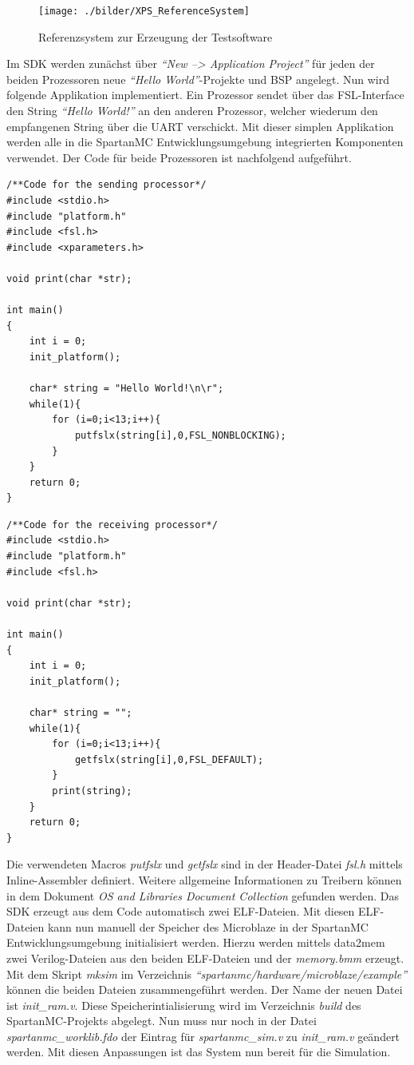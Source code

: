 \begin{figure}[th!]
	\centering
	\texttt{[image: ./bilder/XPS\_ReferenceSystem]}
	\caption{Referenzsystem zur Erzeugung der Testsoftware}
	\label{fig:XPS_ReferenceSystem}
\end{figure}
\noindent
Im SDK werden zunächst über \textit{``New --> Application Project''} für jeden der beiden Prozessoren neue \textit{``Hello World''}-Projekte und BSP angelegt. Nun wird folgende Applikation implementiert. Ein Prozessor sendet über das FSL-Interface den String \textit{``Hello World!''} an den anderen Prozessor, welcher wiederum den empfangenen String über die UART verschickt. Mit dieser simplen Applikation werden alle in die SpartanMC Entwicklungsumgebung integrierten Komponenten verwendet. Der Code für beide Prozessoren ist nachfolgend aufgeführt.
\begin{lstlisting}
/**Code for the sending processor*/
#include <stdio.h>
#include "platform.h"
#include <fsl.h>
#include <xparameters.h>

void print(char *str);

int main()
{
	int i = 0;
    init_platform();

    char* string = "Hello World!\n\r";
    while(1){
    	for (i=0;i<13;i++){
			putfslx(string[i],0,FSL_NONBLOCKING);
		}
    }
    return 0;
}
\end{lstlisting}
\begin{lstlisting}
/**Code for the receiving processor*/
#include <stdio.h>
#include "platform.h"
#include <fsl.h>

void print(char *str);

int main()
{
	int i = 0;
    init_platform();

    char* string = "";
    while(1){
		for (i=0;i<13;i++){
			getfslx(string[i],0,FSL_DEFAULT);
		}
		print(string);
    }
    return 0;
}
\end{lstlisting}
\noindent
Die verwendeten Macros \textit{putfslx} und \textit{getfslx} sind in der Header-Datei \textit{fsl.h} mittels Inline-Assembler definiert. Weitere allgemeine Informationen zu Treibern können in dem Dokument \textit{OS and Libraries Document Collection} \cite{OSLIB} gefunden werden. Das SDK erzeugt aus dem Code automatisch zwei ELF-Dateien. Mit diesen ELF-Dateien kann nun manuell der Speicher des Microblaze in der SpartanMC Entwicklungsumgebung initialisiert werden. Hierzu werden mittels data2mem zwei Verilog-Dateien aus den beiden ELF-Dateien und der \textit{memory.bmm} erzeugt. Mit dem Skript \textit{mksim} im Verzeichnis \textit{``spartanmc/hardware/microblaze/example''} können die beiden Dateien zusammengeführt werden. Der Name der neuen Datei ist \textit{init\_ram.v}. Diese Speicherintialisierung wird im Verzeichnis \textit{build} des SpartanMC-Projekts abgelegt. Nun muss nur noch in der Datei \textit{spartanmc\_worklib.fdo} der Eintrag für \textit{spartanmc\_sim.v} zu \textit{init\_ram.v} geändert werden. Mit diesen Anpassungen ist das System nun bereit für die Simulation.

